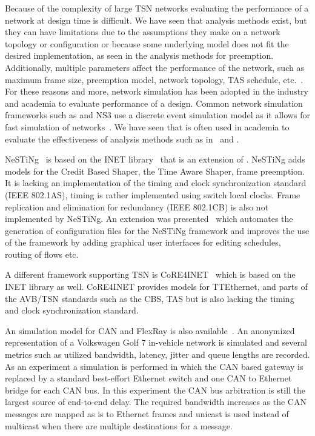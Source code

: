 Because of the complexity of large TSN networks evaluating the performance of a network at design time is difficult. We have seen that analysis methods exist, but they can have limitations due to the assumptions they make on a network topology or configuration or because some underlying model does not fit the desired implementation, as seen in the analysis methods for preemption. Additionally, multiple parameters affect the performance of the network, such as maximum frame size, preemption model, network topology, TAS schedule, etc.~\cite{ashjaei2021time}. For these reasons and more, network simulation has been adopted in the industry and academia to evaluate performance of a design. Common network simulation frameworks such as \omnet and NS3 use a discrete event simulation model as it allows for fast simulation of networks~\cite{ashjaei2021time}. We have seen that \omnet is often used in academia to evaluate the effectiveness of analysis methods such as in~\cite{bello2020schedulability} and \cite{ashjaei2021novel}.

NeSTiNg~\cite{falk2019nesting} is based on the INET library~\cite{meszaros2019inet} that is an extension of \omnet. NeSTiNg adds models for the Credit Based Shaper, the Time Aware Shaper, frame preemption. It is lacking an implementation of the timing and clock synchronization standard (IEEE 802.1AS), timing is rather implemented using switch local clocks. Frame replication and elimination for redundancy (IEEE 802.1CB) is also not implemented by NeSTiNg. An extension was presented~\cite{houtan2021automated} which automates the generation of configuration files for the NeSTiNg framework and improves the use of the framework by adding graphical user interfaces for editing schedules, routing of flows etc.

A different \omnet framework supporting TSN is CoRE4INET~\cite{steinbach2011extension} which is based on the INET library as well. CoRE4INET provides models for TTEthernet, and parts of the AVB/TSN standards such as the CBS, TAS but is also lacking the timing and clock synchronization standard.

An \omnet simulation model for CAN and FlexRay is also available~\cite{meyer2019simulation}. An anonymized representation of a Volkswagen Golf 7 in-vehicle network is simulated and several metrics such as utilized bandwidth, latency, jitter and queue lengths are recorded. As an experiment a simulation is performed in which the CAN based gateway is replaced by a standard best-effort Ethernet switch and one CAN to Ethernet bridge for each CAN bus. In this experiment the CAN bus arbitration is still the largest source of end-to-end delay. The required bandwidth increases as the CAN messages are mapped as is to Ethernet frames and unicast is used instead of multicast when there are multiple destinations for a message.

